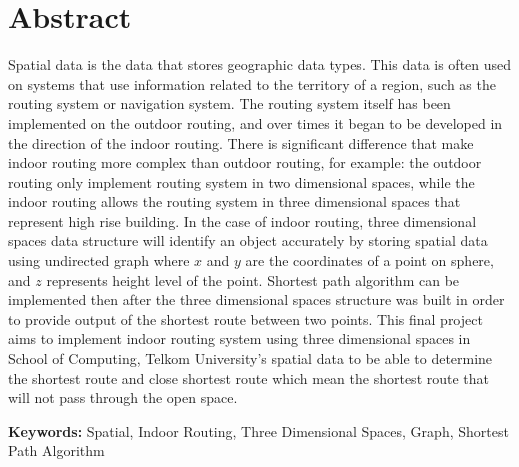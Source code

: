 \chapter*{Abstract}

Spatial data is the data that stores geographic data types. This data is often used on systems that use information related to the territory of a region, such as the routing system or navigation system. The routing system itself has been implemented on the outdoor routing, and over times it began to be developed in the direction of the indoor routing. There is significant difference that make indoor routing more complex than outdoor  routing, for example: the outdoor routing only implement routing system in two dimensional spaces, while the indoor routing allows the routing system in three dimensional spaces that represent high rise building. In the case of indoor routing, three dimensional spaces data structure will identify an object accurately by storing spatial data using undirected graph where $x$ and $y$ are the coordinates of a point on sphere, and $z$ represents height level of the point. Shortest path algorithm can be implemented then after the three dimensional spaces structure was built in order to provide output of the shortest route between two points. This final project aims to implement indoor routing system using three dimensional spaces in School of Computing, Telkom University’s spatial data to be able to determine the shortest route and  close shortest route which mean the shortest route that will not pass through the open space. 

\vspace{0.5 cm}
\begin{flushleft}
{\textbf{Keywords:} Spatial, Indoor Routing, Three Dimensional Spaces, Graph, Shortest Path Algorithm}
\end{flushleft}